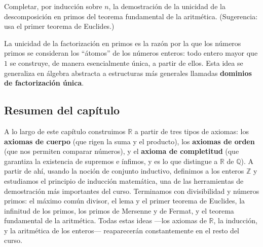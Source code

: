 \documentclass[12pt,a4paper]{book}
\begin{document}
  \begin{problema}
    Completar, por inducción sobre $n$, la demostración de la unicidad de la descomposición en primos del teorema fundamental de la aritmética. (Sugerencia: usa el primer teorema de Euclides.)
  \end{problema}
  
  La unicidad de la factorización en primos es la razón por la que los números primos se consideran los ``átomos'' de los números enteros: todo entero mayor que $1$ se construye, de manera esencialmente única, a partir de ellos. Esta idea se generaliza en álgebra abstracta a estructuras más generales llamadas \textbf{dominios de factorización única}.
  
  \subsection*{Resumen del capítulo}
  
  A lo largo de este capítulo construimos $\mathbb{R}$ a partir de tres tipos de axiomas: los \textbf{axiomas de cuerpo} (que rigen la suma y el producto), los \textbf{axiomas de orden} (que nos permiten comparar números), y el \textbf{axioma de completitud} (que garantiza la existencia de supremos e ínfimos, y es lo que distingue a $\mathbb{R}$ de $\mathbb{Q}$). A partir de ahí, usando la noción de conjunto inductivo, definimos a los enteros $\mathbb{Z}$ y estudiamos el principio de inducción matemática, una de las herramientas de demostración más importantes del curso. Terminamos con divisibilidad y números primos: el máximo común divisor, el lema y el primer teorema de Euclides, la infinitud de los primos, los primos de Mersenne y de Fermat, y el teorema fundamental de la aritmética. Todas estas ideas —los axiomas de $\mathbb{R}$, la inducción, y la aritmética de los enteros— reaparecerán constantemente en el resto del curso.

      
\end{document}
